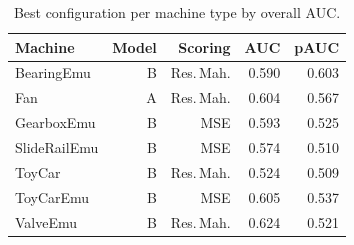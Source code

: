 \begin{table}[!htb]
\centering
\caption{Best configuration per machine type by overall AUC.}
\label{tab:best}
\footnotesize
\renewcommand{\arraystretch}{1.18}
\begin{tabular}{lrrrr}
\toprule
Machine & Model & Scoring & AUC & pAUC \\
\midrule
BearingEmu & B & Res.\,Mah. & 0.590 & 0.603 \\
Fan & A & Res.\,Mah. & 0.604 & 0.567 \\
GearboxEmu & B & MSE & 0.593 & 0.525 \\
SlideRailEmu & B & MSE & 0.574 & 0.510 \\
ToyCar & B & Res.\,Mah. & 0.524 & 0.509 \\
ToyCarEmu & B & MSE & 0.605 & 0.537 \\
ValveEmu & B & Res.\,Mah. & 0.624 & 0.521 \\
\bottomrule
\end{tabular}
\end{table}